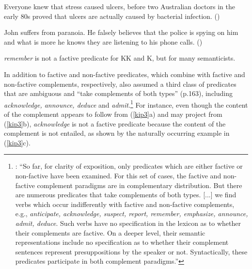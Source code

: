 \documentclass[11pt,fleqn]{article}
\newcommand{\6}{\mbox{$[\hspace*{-.6mm}[$}}
\newcommand{\9}{\mbox{$]\hspace*{-.6mm}]$}}
\begin{document}
\begin{itemize}
\begin{exe}
\begin{xlist}
\ex Everyone knew that stress caused ulcers, before two Australian doctors in the early 80s proved that ulcers are actually caused by bacterial infection. \hfill (\citealt[501]{hazlett2010})

\ex John suffers from paranoia. He falsely believes that the police is spying on him and what is more he knows they are listening to his phone calls. \hfill (\citealt[514]{abrusan2011})



\end{xlist}

\end{exe}



\end{itemize}

 {\em remember} is not a factive predicate for KK and K, but for many semanticists.
 
In addition to factive and non-factive predicates, which combine with factive and non-factive complements, respectively, \citet{kiparsky-kiparsky70} also assumed a third class of predicates that are ambiguous and ``take complements of both types'' (p.163), including {\em acknowledge, announce, deduce} and {\em admit}.\footnote{\citealt[163]{kiparsky-kiparsky70}: ``So far, for clarity of exposition, only predicates which are either factive or non-factive have been examined. For this set of cases, the factive and non-factive complement paradigms are in complementary distribution. But there are numerous predicates that take complements of both types. [...] we find verbs which occur indifferently with factive and non-factive complements, e.g., {\em anticipate, acknowledge, suspect, report, remember, emphasize, announce, admit, deduce}. Such verbs have no specification in the lexicon as to whether their complements are factive. On a deeper level, their semantic representations include no specification as to whether their complement sentences represent presuppositions by the speaker or not. Syntactically, these predicates participate in both complement paradigms.''} For instance, even though the content of the complement appears to follow from (\ref{kip3}a) and may project from (\ref{kip3}b), {\em acknowledge} is not a factive predicate because the content of the complement is not entailed, as shown by the naturally occurring example in (\ref{kip3}c).
\end{document}
